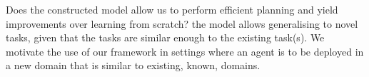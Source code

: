 Does the constructed model allow us to perform efficient planning and yield improvements over learning from scratch? 
the model allows generalising to novel tasks, given that the tasks are similar enough to the existing task(s).
We motivate the use of our framework in settings where an agent is to be deployed in a new domain that is similar to existing, known, domains.
